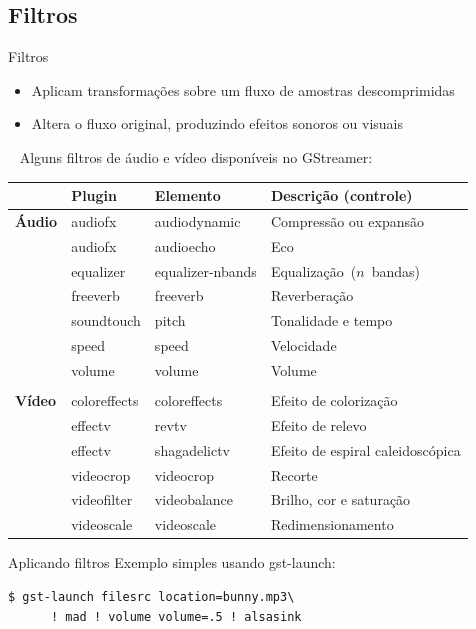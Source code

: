 \documentclass{beamer}
\begin{document}
\subsection{Filtros}
\begin{frame}[fragile]{Filtros}
  \begin{itemize}
    \item Aplicam transformações sobre um fluxo de amostras descomprimidas
    \item Altera o fluxo original, produzindo efeitos sonoros ou visuais
  \end{itemize}
  ~
  Alguns filtros de áudio e vídeo disponíveis no GStreamer:
  \begin{table}[h]
    \sffamily
    \scriptsize
    \centering
    \begin{tabular}{llll}
      \toprule
      &\textbf{Plugin}
      &\textbf{Elemento}
      &\textbf{Descrição (controle)}\\
      \midrule
      \textbf{Áudio}
      &audiofx    & audiodynamic & Compressão ou expansão\\
      &audiofx    & audioecho    & Eco\\
      &equalizer  & equalizer-nbands& Equalização~($n$~bandas)\\
      &freeverb   & freeverb     & Reverberação\\
      &soundtouch & pitch        & Tonalidade e tempo\\
      &speed      & speed        & Velocidade\\
      &volume     & volume       & Volume\\
      \multicolumn{4}{l}{\dotfill}\\
      \textbf{Vídeo}
      &coloreffects& coloreffects& Efeito de colorização\\
      &effectv     & revtv       & Efeito de relevo\\
      &effectv     & shagadelictv& Efeito de espiral caleidoscópica\\
      &videocrop   & videocrop   & Recorte\\
      &videofilter & videobalance& Brilho, cor e saturação\\
      &videoscale  & videoscale  & Redimensionamento\\
      \bottomrule
    \end{tabular}
  \end{table}
\end{frame}

\begin{frame}[fragile]{Aplicando filtros}
  Exemplo simples usando gst-launch:
  \begin{lstlisting}[style=command]
$ gst-launch filesrc location=bunny.mp3\
      ! mad ! volume volume=.5 ! alsasink
  \end{lstlisting}
\end{frame}
\end{document}

